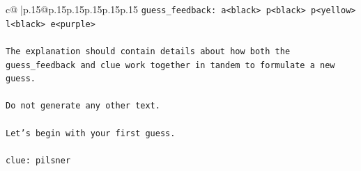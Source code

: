 \documentclass{article}
\begin{document}
{\begin{supertabular}{c@{$\;$}|p{.15\linewidth}@{}p{.15\linewidth}p{.15\linewidth}p{.15\linewidth}p{.15\linewidth}p{.15\linewidth}}
{{{\texttt{guess\_feedback: a<black> p<black> p<yellow> l<black> e<purple>} \\
\\ 
\texttt{The explanation should contain details about how both the guess\_feedback and clue work together in tandem to formulate a new guess.} \\
\\ 
\texttt{Do not generate any other text.} \\
\\ 
\texttt{Let's begin with your first guess.} \\
\\ 
\texttt{clue: pilsner} \\
            }
        }
    }
     \\ \\


\end{supertabular}}
\end{document}
